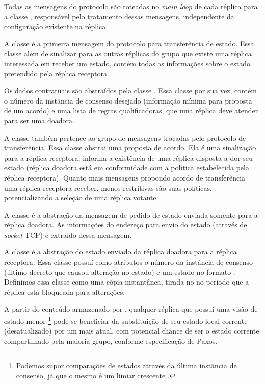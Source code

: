 Todas as mensagens do protocolo são roteadas no \emph{main loop} de cada réplica para a
classe , responsável pelo tratamento dessas mensagens, independente da
configuração existente na réplica.


A classe  é a primeira mensagem do protocolo para transferência
de estado. Essa classe além de sinalizar para as outras réplicas do grupo que existe uma
réplica interessada em receber um estado, contém todas as informações sobre o estado
pretendido pela réplica receptora.

Os dados contratuais são abstraídos pela classe . Essa classe por sua
vez, contém o número da instância de consenso desejado (informação mínima para proposta de
um acordo) e uma lista de regras qualificadoras, que uma réplica deve atender para ser uma
doadora.


A classe  também pertence ao grupo de mensagens trocadas pelo
protocolo de transferência. Essa classe abstrai uma proposta de acordo. Ela é uma
sinalização para a réplica receptora, informa a existência de uma réplica disposta a dor
seu estado (réplica doadora está em conformidade com a política estabelecida pela réplica
receptora). Quanto mais mensagens propondo acordo de transferência uma réplica receptora
receber, menos restritivas são suas políticas, potencializando a seleção de uma réplica
votante.


A classe  é a abstração da mensagem de pedido de estado enviada
somente para a réplica doadora. As informações do endereço para envio do estado (através
de \emph{socket} TCP) é extraído dessa mensagem.


A classe  é a abstração do estado enviado da réplica doadora para
a réplica receptora. Essa classe possuí como atributos o número da instância de consenso
(último decreto que causou alteração no estado) e um estado no formato
. Definimos essa classe como uma cópia instantânea, tirada
no no período que a réplica está bloqueada para alterações.

A partir do conteúdo armazenado por , qualquer réplica que possuí
uma visão de estado menor \footnote{Podemos supor comparações de estados através da última
instância de consenso, já que o mesmo é um limiar crescente \cite{vieira-10b}.} pode se
beneficiar da substituição de seu estado local corrente (desatualizado) por um mais atual,
com potencial chance de ser o estado corrente compartilhado pela maioria grupo, conforme
especificação de Paxos.

